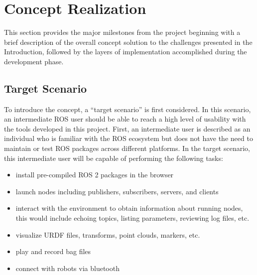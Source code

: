 \chapter{Concept Realization}\label{cha:concept}

    This section provides the major milestones from the project beginning with a
    brief description of the overall concept solution to the challenges presented
    in the Introduction, followed by the layers of implementation accomplished 
    during the development phase.


\section{Target Scenario}\label{sec:target}



    To introduce the concept, a ``target scenario'' is first considered. In this
    scenario, an intermediate \ac{ROS} user should be able to reach a high level 
    of usability with the tools developed in this project. First, an
    intermediate user is described as an individual who is familiar with the 
    \ac{ROS} ecosystem but does not have the need to maintain or test \ac{ROS} packages
    across different platforms. In the target scenario, this intermediate
    user will be capable of performing the following tasks:

    \begin{itemize}
        \item install pre-compiled ROS 2 packages in the browser
        \item launch nodes including publishers, subscribers, servers, and clients
        \item interact with the environment to obtain information about 
                running nodes, this would include echoing topics, listing 
                parameters, reviewing log files, etc.
        \item visualize \ac{URDF} files, transforms, point clouds, markers, etc.
        \item play and record bag files %
        \item connect with robots via bluetooth
    \end{itemize}

